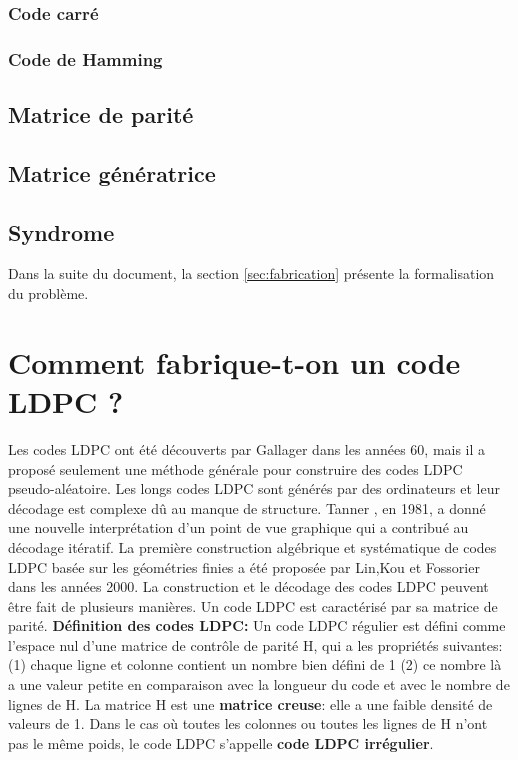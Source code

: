 \documentclass[french,nochapter,11pt]{rapportUB}
\begin{document}
\subsubsection{Code carré}
\subsubsection{Code de Hamming}
\subsection{Matrice de parité}
\subsection{Matrice génératrice}
\subsection{Syndrome}

\vspace{0.8cm}
Dans la suite du document, la section \ref{sec:fabrication} présente la formalisation du problème.


\section{Comment fabrique-t-on un code LDPC ?}
Les codes LDPC ont été découverts par Gallager dans les années 60, mais il a proposé seulement une méthode générale pour construire des codes LDPC pseudo-aléatoire. \newline
Les longs codes LDPC sont générés par des ordinateurs et leur décodage est complexe dû au manque de structure. Tanner , en 1981, a donné une nouvelle interprétation d'un point de vue graphique qui a contribué au décodage itératif. \newline
La première construction algébrique et systématique de codes LDPC basée sur les géométries finies a été proposée par Lin,Kou et Fossorier dans les années 2000. \newline
La construction et le décodage des codes LDPC peuvent être fait de plusieurs manières. Un code LDPC est caractérisé par sa matrice de parité. \newline
\textbf{Définition des codes LDPC:} Un code LDPC régulier est défini comme l'espace nul d'une matrice de contrôle de parité H, qui a les propriétés suivantes: \newline
(1) chaque ligne et colonne contient un nombre bien défini de 1
(2) ce nombre là a une valeur petite en comparaison avec la longueur du code et avec le nombre de lignes de H. \newline
La matrice H est une \textbf{matrice creuse}: elle a une faible densité de valeurs de 1. \newline
Dans le cas où toutes les colonnes ou toutes les lignes de H n'ont pas le même poids, le code LDPC s'appelle \textbf{code LDPC irrégulier}. \newline
\end{document}
